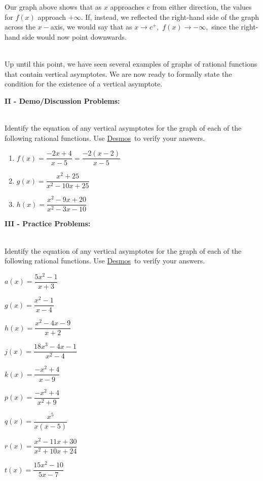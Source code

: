 \documentclass[12pt]{article}
\theoremstyle{definition}
\newcommand{\Desmos}{\href{https://www.desmos.com/}{Desmos}}
\begin{document}
Our graph above shows that as $x$ approaches $c$ from either direction, the values for $f(x)$ approach $+\infty$.  If, instead, we reflected the right-hand side of the graph across the $x-$axis, we would say that as $x\rightarrow c^+,$ $f(x)\rightarrow -\infty,$ since the right-hand side would now point downwards.\\
\ \par
Up until this point, we have seen several examples of graphs of rational functions that contain vertical asymptotes.  We are now ready to formally state the condition for the existence of a vertical asymptote.
\begin{center}
\end{center}
{\bf II - Demo/Discussion Problems:}\\
\ \par
Identify the equation of any vertical asymptotes for the graph of each of the following rational functions.  Use \Desmos \ to verify your answers.
\begin{enumerate}
\item $f(x)=\dfrac{-2x+4}{x-5}=\dfrac{-2(x-2)}{x-5}$\\
\item $g(x)=\dfrac{x^2+25}{x^2-10x+25}$\\
\item $h(x)=\dfrac{x^2-9x+20}{x^2-3x-10}$
\end{enumerate}
{\bf III - Practice Problems:}\\
\ \par
Identify the equation of any vertical asymptotes for the graph of each of the following rational functions.  Use \Desmos \ to verify your answers.
\begin{enumerate}
\begin{multicols}{3}
\item $a(x)=\dfrac{5x^2-1}{x+3}$
\item $g(x)=\dfrac{x^2-1}{x-4}$
\item $h(x)=\dfrac{x^2-4x-9}{x+2}$
\item $j(x)=\dfrac{18x^3-4x-1}{x^2-4}$
\item $k(x)=\dfrac{-x^2+4}{x-9}$
\item $p(x)=\dfrac{-x^2+4}{x^2+9}$
\item $q(x)=\dfrac{x^5}{x(x-5)}$
\item $r(x)=\dfrac{x^2-11x+30}{x^2+10x+24}$
\item $t(x)=\dfrac{15x^2-10}{5x-7}$
\end{multicols}
\end{enumerate}
\newpage
\end{document}
